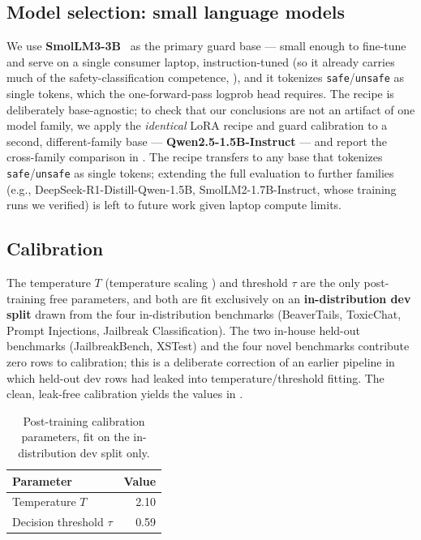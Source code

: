 \documentclass[sigconf,nonacm]{acmart}
\begin{document}
\subsection{Model selection: small language models}

We use \textbf{SmolLM3-3B}~\cite{bakouch2025smollm3} as the primary guard base --- small enough to fine-tune and serve on a single consumer laptop, instruction-tuned (so it already carries much of the safety-classification competence, ), and it tokenizes \texttt{safe}/\texttt{unsafe} as single tokens, which the one-forward-pass logprob head requires. The recipe is deliberately base-agnostic; to check that our conclusions are not an artifact of one model family, we apply the \emph{identical} LoRA recipe and guard calibration to a second, different-family base --- \textbf{Qwen2.5-1.5B-Instruct} --- and report the cross-family comparison in . The recipe transfers to any base that tokenizes \texttt{safe}/\texttt{unsafe} as single tokens; extending the full evaluation to further families (e.g., DeepSeek-R1-Distill-Qwen-1.5B, SmolLM2-1.7B-Instruct, whose training runs we verified) is left to future work given laptop compute limits.

\subsection{Calibration}

The temperature $T$ (temperature scaling \cite{guo2017calibration}) and threshold $\tau$ are the only post-training free parameters, and both are fit exclusively on an \textbf{in-distribution dev split} drawn from the four in-distribution benchmarks (BeaverTails, ToxicChat, Prompt Injections, Jailbreak Classification). The two in-house held-out benchmarks (JailbreakBench, XSTest) and the four novel benchmarks contribute zero rows to calibration; this is a deliberate correction of an earlier pipeline in which held-out dev rows had leaked into temperature/threshold fitting. The clean, leak-free calibration yields the values in .

\begin{table}[t]
\small
\centering
\caption{Post-training calibration parameters, fit on the in-distribution dev split only.}
\label{tab:calibration}
\begin{tabular}{lr}
\toprule
Parameter & Value \\
\midrule
Temperature $T$ & 2.10 \\
Decision threshold $\tau$ & 0.59 \\
\bottomrule
\end{tabular}
\end{table}
\end{document}
